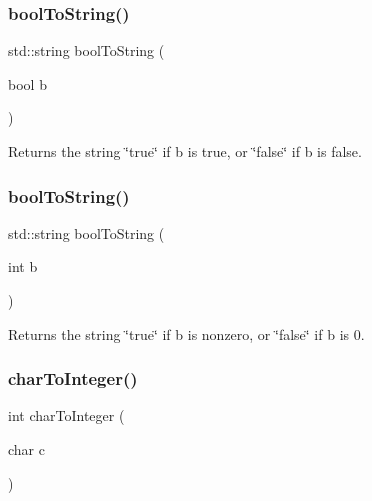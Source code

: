 \subsubsection{\texorpdfstring{bool\+To\+String()}{boolToString()}\hspace{0.1cm}{\footnotesize\ttfamily [1/2]}}
{\footnotesize\ttfamily std\+::string bool\+To\+String (\begin{DoxyParamCaption}\item[{bool}]{b }\end{DoxyParamCaption})}



Returns the string \char`\"{}true\char`\"{} if b is true, or \char`\"{}false\char`\"{} if b is false. 

\mbox{\label{namespacesgl_1_1priv_1_1strlib_a3300f402b35ce83e6d5c5cf6e072d28f}} 
\subsubsection{\texorpdfstring{bool\+To\+String()}{boolToString()}\hspace{0.1cm}{\footnotesize\ttfamily [2/2]}}
{\footnotesize\ttfamily std\+::string bool\+To\+String (\begin{DoxyParamCaption}\item[{int}]{b }\end{DoxyParamCaption})}



Returns the string \char`\"{}true\char`\"{} if b is nonzero, or \char`\"{}false\char`\"{} if b is 0. 

\mbox{\label{namespacesgl_1_1priv_1_1strlib_ab5a53662a70083a78e227d1da5ccd5aa}} 
\subsubsection{\texorpdfstring{char\+To\+Integer()}{charToInteger()}}
{\footnotesize\ttfamily int char\+To\+Integer (\begin{DoxyParamCaption}\item[{char}]{c }\end{DoxyParamCaption})}



